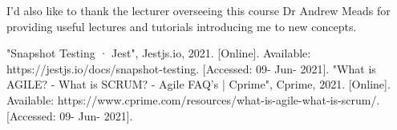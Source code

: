 \documentclass[conference]{IEEEtran}
\begin{document}
I'd also like to thank the lecturer overseeing this course Dr Andrew Meads for providing useful lectures and tutorials introducing me to new concepts.

\begin{thebibliography}{00}
"Snapshot Testing · Jest", Jestjs.io, 2021. [Online]. Available: https://jestjs.io/docs/snapshot-testing. [Accessed: 09- Jun- 2021].
"What is AGILE? - What is SCRUM? - Agile FAQ's | Cprime", Cprime, 2021. [Online]. Available: https://www.cprime.com/resources/what-is-agile-what-is-scrum/. [Accessed: 09- Jun- 2021].
\end{thebibliography}
\end{document}
